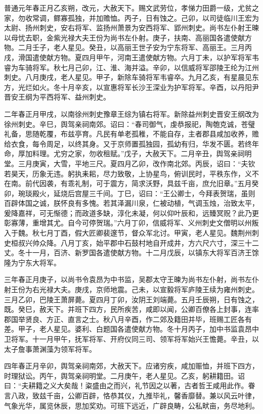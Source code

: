 \documentclass[12pt,UTF8]{ctexbook}
\begin{document}
普通元年春正月乙亥朔，改元，大赦天下。赐文武劳位，孝悌力田爵一级，尤贫之家，勿收常调，鳏寡孤独，并加赡恤。丙子，日有蚀之。己卯，以司徒临川王宏为太尉、扬州刺史，安右将军、监扬州萧景为安西将军、郢州刺史。尚书左仆射王暕以母忧去职，金紫光禄大夫王份为尚书左仆射。庚子，扶南、高丽国各遣使献方物。二月壬子，老人星见。癸丑，以高丽王世子安为宁东将军、高丽王。三月丙戌，滑国遣使献方物。夏四月甲午，河南王遣使献方物。六月丁未，以护军将军韦睿为车骑将军。秋七月己卯，江、淮、海并溢。辛卯，以信威将军邵陵王纶为江州刺史。八月庚戌，老人星见。甲子，新除车骑将军韦睿卒。九月乙亥，有星晨见东方，光烂如火。冬十月辛亥，以宣惠将军长沙王深业为护军将军。辛酉，以丹阳尹晋安王纲为平西将军、益州刺史。

二年春正月甲戌，以南徐州刺史豫章王综为镇右将军。新除益州刺史晋安王纲改为徐州刺史。辛巳，舆驾亲祠南郊。诏曰：“春司御气，虔恭报祀，陶匏克诚，苍璧礼备，思随乾覆，布兹亭育。凡民有单老孤稚，不能自存，主者郡县咸加收养，赡给衣食，每令周足，以终其身。又于京师置孤独园，孤幼有归，华发不匮。若终年命，厚加料理。尤穷之家，勿收租赋。”戊子，大赦天下。二月辛丑，舆驾亲祠明堂。三月庚寅，大雪，平地三尺。夏四月乙卯，改作南北郊。丙辰，诏曰：“夫钦若昊天，历象无违。躬执耒耜，尽力致敬，上协星鸟，俯训民时，平秩东作，义不在南。前代因袭，有乖礼制，可于震方，简求沃野，具兹千亩，庶允旧章。”五月癸卯，琬琰殿火，延烧后宫屋三千间。丁巳，诏曰：“王公卿士，今拜表贺瑞，虽则百辟体国之诚，朕怀良有多愧。若其泽漏川泉，仁被动植，气调玉烛，治致太平，爰降嘉祥，可无惭德；而政道多缺，淳化未凝，何以仰叶辰和，远臻冥贶？此乃更彰寡薄，重增其尤。自今可停贺瑞。”六月丁卯，信威将军、义州刺史文僧明以州叛入于魏。秋七月丁酉，假大匠卿裴邃节，督众军北讨。甲寅，老人星见。魏荆州刺史桓叔兴帅众降。八月丁亥，始平郡中石鼓村地自开成井，方六尺六寸，深三十二丈。冬十一月，百济、新罗国各遣使献方物。十二月戊辰，以镇东大将军百济王馀隆为宁东大将军。

三年春正月庚子，以尚书令袁昂为中书监，吴郡太守王暕为尚书左仆射，尚书左仆射王份为右光禄大夫。庚戌，京师地震。己未，以宣毅将军庐陵王续为雍州刺史。三月乙卯，巴陵王萧屏薨。夏四月丁卯，汝阴王刘端薨。五月壬辰朔，日有蚀之，既。癸巳，赦天下。并班下四方，民所疾苦，咸即以闻，公卿百僚各上封事，连率郡国举贤良、方正、直言之士。秋八月辛酉，作二郊及籍田并毕，班赐工匠各有差。甲子，老人星见。婆利、白题国各遣使献方物。冬十月丙子，加中书监袁昂中卫将军。十一月甲午，抚军将军、开府仪同三司、领军将军始兴王憺薨。辛丑，以太子詹事萧渊藻为领军将军。

四年春正月辛卯，舆驾亲祠南郊，大赦天下。应诸穷疾，咸加赈恤，并班下四方，时理狱讼。丙午，舆驾亲祠明堂。二月庚午，老人星见。乙亥，躬耕籍田。诏曰：“夫耕籍之义大矣哉！粢盛由之而兴，礼节因之以著，古者哲王咸用此作。眷言八政，致兹千亩，公卿百辟，恪恭其仪，九推毕礼，馨香靡替。兼以风云叶律，气象光华，属览休辰，思加奖劝。可班下远近，广辟良畴，公私畎亩，务尽地利。
\end{document}
